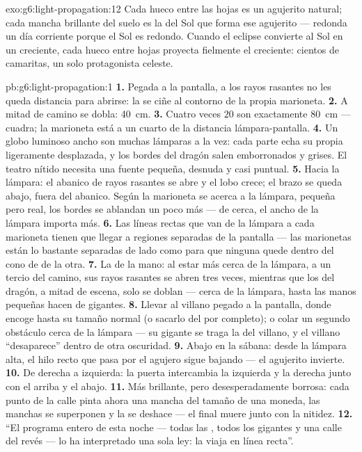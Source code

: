 \begin{solution}{exo:g6:light-propagation:12}
Cada hueco entre las hojas es un agujerito natural; cada mancha
brillante del suelo es la  del Sol que forma ese agujerito
--- redonda un día corriente porque el Sol es redondo. Cuando el
eclipse convierte al Sol en un creciente, cada hueco entre hojas
proyecta fielmente el creciente: cientos de camaritas, un solo
protagonista celeste.
\end{solution}

\begin{solution}{pb:g6:light-propagation:1}
\textbf{1.} Pegada a la pantalla, a los rayos rasantes no les queda
distancia para abrirse: la  se ciñe al contorno de la propia
marioneta.
\textbf{2.} A mitad de camino se dobla: \qty{40}{cm}.
\textbf{3.} Cuatro veces $20$ son exactamente \qty{80}{cm} --- cuadra;
la marioneta está a un cuarto de la distancia lámpara-pantalla.
\textbf{4.} Un globo luminoso ancho son muchas lámparas a la vez:
cada parte echa su propia  ligeramente desplazada, y los
bordes del dragón salen emborronados y grises. El teatro nítido
necesita una fuente pequeña, desnuda y casi puntual.
\textbf{5.} Hacia la lámpara: el abanico de rayos rasantes se abre y
el lobo crece; el brazo se queda abajo, fuera del abanico. Según la
marioneta se acerca a la lámpara, pequeña pero real, los bordes se
ablandan un poco más --- de cerca, el ancho de la lámpara importa
más.
\textbf{6.} Las líneas rectas que van de la lámpara a cada marioneta
tienen que llegar a regiones separadas de la pantalla --- las
marionetas están lo bastante separadas de lado como para que ninguna
quede dentro del cono de  de la otra.
\textbf{7.} La de la mano: al estar más cerca de la lámpara, a un
tercio del camino, sus rayos rasantes se abren tres veces, mientras
que los del dragón, a mitad de escena, solo se doblan --- cerca de la
lámpara, hasta las manos pequeñas hacen de gigantes.
\textbf{8.} Llevar al villano pegado a la pantalla, donde encoge
hasta su tamaño normal (o sacarlo del  por completo); o colar
un segundo obstáculo cerca de la lámpara --- su  gigante se
traga la del villano, y el villano ``desaparece'' dentro de otra
oscuridad.
\textbf{9.} Abajo en la sábana: desde la lámpara alta, el hilo recto
que pasa por el agujero sigue bajando --- el agujerito invierte.
\textbf{10.} De derecha a izquierda: la puerta intercambia la
izquierda y la derecha junto con el arriba y el abajo.
\textbf{11.} Más brillante, pero desesperadamente borrosa: cada punto
de la calle pinta ahora una mancha del tamaño de una moneda, las
manchas se superponen y la  se deshace --- el final muere junto
con la nitidez.
\textbf{12.} ``El programa entero de esta noche --- todas las
, todos los gigantes y una calle del revés --- lo ha
interpretado una sola ley: la  viaja en línea recta''.
\end{solution}
